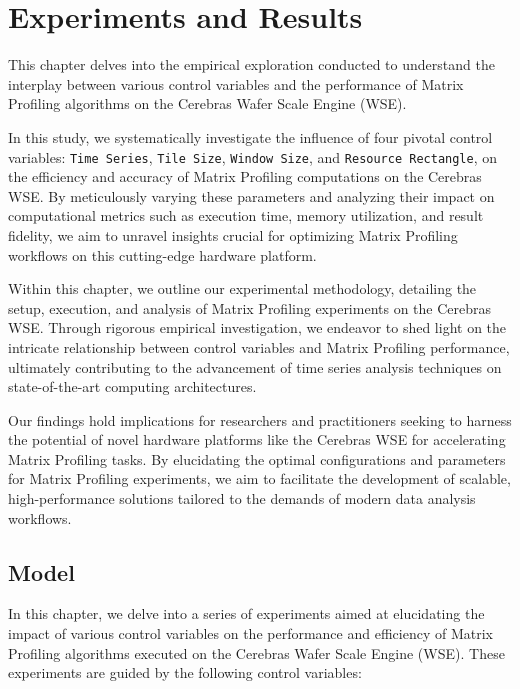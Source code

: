 \chapter{Experiments and Results}\label{chapter:measurements}

This chapter delves into the empirical exploration conducted to understand the interplay between various control variables and the performance of Matrix Profiling algorithms on the Cerebras Wafer Scale Engine (WSE).

In this study, we systematically investigate the influence of four pivotal control variables: \texttt{Time Series}, \texttt{Tile Size}, \texttt{Window Size}, and \texttt{Resource Rectangle}, on the efficiency and accuracy of Matrix Profiling computations on the Cerebras WSE. By meticulously varying these parameters and analyzing their impact on computational metrics such as execution time, memory utilization, and result fidelity, we aim to unravel insights crucial for optimizing Matrix Profiling workflows on this cutting-edge hardware platform.

Within this chapter, we outline our experimental methodology, detailing the setup, execution, and analysis of Matrix Profiling experiments on the Cerebras WSE. Through rigorous empirical investigation, we endeavor to shed light on the intricate relationship between control variables and Matrix Profiling performance, ultimately contributing to the advancement of time series analysis techniques on state-of-the-art computing architectures.

Our findings hold implications for researchers and practitioners seeking to harness the potential of novel hardware platforms like the Cerebras WSE for accelerating Matrix Profiling tasks. By elucidating the optimal configurations and parameters for Matrix Profiling experiments, we aim to facilitate the development of scalable, high-performance solutions tailored to the demands of modern data analysis workflows.

\clearpage

\section{Model}

In this chapter, we delve into a series of experiments aimed at elucidating the impact of various control variables on the performance and efficiency of Matrix Profiling algorithms executed on the Cerebras Wafer Scale Engine (WSE). These experiments are guided by the following control variables:

